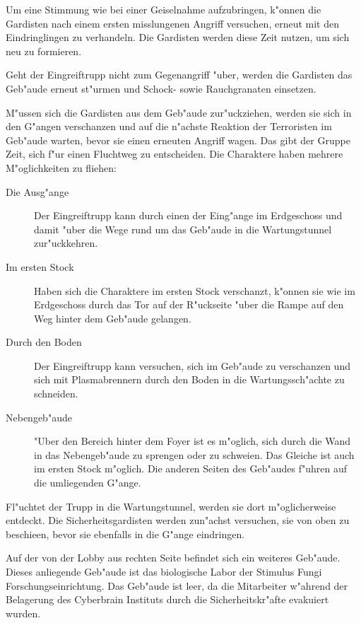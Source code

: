 Um eine Stimmung wie bei einer Geiselnahme aufzubringen, k"onnen die Gardisten nach einem ersten misslungenen Angriff versuchen, erneut mit den Eindringlingen zu verhandeln. Die Gardisten werden diese Zeit nutzen, um sich neu zu formieren.

Geht der Eingreiftrupp nicht zum Gegenangriff "uber, werden die Gardisten das Geb"aude erneut st"urmen und Schock- sowie Rauchgranaten einsetzen.

M"ussen sich die Gardisten aus dem Geb"aude zur"uckziehen, werden sie sich in den G"angen verschanzen und auf die n"achste Reaktion der  Terroristen im Geb"aude warten, bevor sie einen erneuten Angriff wagen. Das gibt der Gruppe Zeit, sich f"ur einen Fluchtweg zu entscheiden. Die Charaktere haben mehrere M"oglichkeiten zu fliehen:

\begin{description}
	\item [Die Ausg"ange] Der Eingreiftrupp kann durch einen der Eing"ange im Erdgeschoss und damit "uber die Wege rund um das Geb"aude in 
		die Wartungstunnel zur"uckkehren.
	\item [Im ersten Stock] Haben sich die Charaktere im ersten Stock verschanzt, k"onnen sie wie im Erdgeschoss durch das Tor auf der
		R"uckseite "uber die Rampe auf den Weg hinter dem Geb"aude gelangen.
	\item [Durch den Boden] Der Eingreiftrupp kann versuchen, sich im Geb"aude zu verschanzen und sich mit Plasmabrennern durch den Boden in	
		die Wartungssch"achte zu schneiden.
	\item [Nebengeb"aude] "Uber den Bereich hinter dem Foyer ist es m"oglich, sich durch die Wand in das Nebengeb"aude zu sprengen oder zu	
		schwei\3en. Das Gleiche ist auch im ersten Stock m"oglich. Die anderen Seiten des Geb"audes f"uhren auf die umliegenden G"ange.
\end{description}

Fl"uchtet der Trupp in die Wartungstunnel, werden sie dort m"oglicherweise entdeckt. Die Sicherheitsgardisten werden zun"achst versuchen, sie von oben zu beschie\3en, bevor sie ebenfalls in die G"ange eindringen.

Auf der von der Lobby aus rechten Seite befindet sich ein weiteres Geb"aude. Dieses anliegende Geb"aude ist das biologische Labor der Stimulus Fungi Forschungseinrichtung. Das Geb"aude ist leer, da die Mitarbeiter w"ahrend der Belagerung des Cyberbrain Instituts durch die Sicherheitskr"afte evakuiert wurden.

